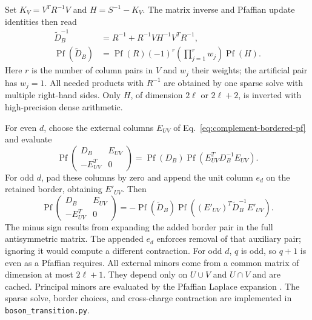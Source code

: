 Set $K_V=V^TR^{-1}V$ and $H=S^{-1}-K_V$. The matrix inverse and
Pfaffian update identities then read
\begin{align}
 \widetilde D_B^{-1}
 &=R^{-1}+R^{-1}VH^{-1}V^TR^{-1},\nonumber\\
 \operatorname{Pf}(\widetilde D_B)
 &=\operatorname{Pf}(R)(-1)^r
       \left(\prod_{j=1}^r w_j\right)\operatorname{Pf}(H).
 \label{eq:complement-pf-update}
\end{align}
Here $r$ is the number of column pairs in $V$ and $w_j$ their weights;
the artificial pair has $w_j=1$.
All needed products with $R^{-1}$ are obtained by one sparse solve
with multiple right-hand sides. Only $H$, of dimension $2\ell$ or
$2\ell+2$, is inverted with high-precision dense arithmetic.

For even $d$, choose the external columns $E_{UV}$ of
Eq.~\eqref{eq:complement-bordered-pf} and evaluate
\begin{equation}
 \operatorname{Pf}
 \begin{pmatrix}D_B&E_{UV}\\-E_{UV}^T&0\end{pmatrix}
 =\operatorname{Pf}(D_B)
  \operatorname{Pf}(E_{UV}^TD_B^{-1}E_{UV}).
 \label{eq:complement-even-reduction}
\end{equation}
For odd $d$, pad these columns by zero and append the unit column
$e_d$ on the retained border, obtaining $E'_{UV}$. Then
\begin{equation}
 \operatorname{Pf}
 \begin{pmatrix}D_B&E_{UV}\\-E_{UV}^T&0\end{pmatrix}
 =-\operatorname{Pf}(\widetilde D_B)
  \operatorname{Pf}((E'_{UV})^T\widetilde D_B^{-1}E'_{UV}).
 \label{eq:complement-odd-reduction}
\end{equation}
The minus sign results from expanding the added border pair in the
full antisymmetric matrix. The appended $e_d$ enforces removal of
that auxiliary pair; ignoring it would compute a different contraction.
For odd $d$, $q$ is odd, so $q+1$ is even as a Pfaffian requires.
All external minors come from a common matrix of dimension at most
$2\ell+1$. They depend only on $U\cup V$ and $U\cap V$ and are cached.
Principal minors are evaluated by the Pfaffian Laplace expansion
\cite{Wimmer}. The sparse solve, border choices, and cross-charge
contraction are implemented in \texttt{boson\_transition.py}.

